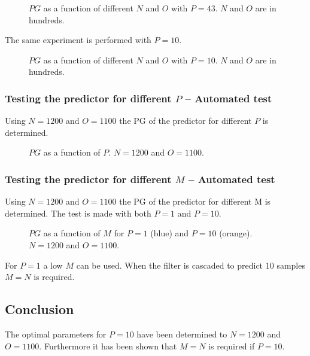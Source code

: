 \begin{figure}[H]
	\centering
	
	\caption{$PG$ as a function of different $N$ and $O$ with $P=43$. $N$ and $O$ are in hundreds.}
	\label{fig:Predict43App}
\end{figure}

The same experiment is performed with $P=10$.
\begin{figure}[H]
	\centering
	
	\caption{$PG$ as a function of different $N$ and $O$ with $P=10$. $N$ and $O$ are in hundreds.}
	\label{fig:Predict10App}
\end{figure}


\subsubsection{Testing the predictor for different $P$ -- Automated test}
Using $N=1200$ and $O=1100$ the PG of the predictor for different $P$ is determined. 
\begin{figure}[H]
	\centering
	
	\caption{$PG$ as a function of $P$. $N=1200$ and $O=1100$.}
	\label{fig:PredictPApp}
\end{figure}

\subsubsection{Testing the predictor for different $M$ -- Automated test}
Using $N=1200$ and $O=1100$ the PG of the predictor for different M is determined. The test is made with both $P=1$ and $P=10$. 
\begin{figure}[H]
	\centering
	
	\caption{$PG$ as a function of $M$ for $P=1$ (blue) and $P=10$ (orange).  $N=1200$ and $O=1100$.}
	\label{fig:PredictMApp}
\end{figure}
For $P=1$ a low $M$ can be used. When the filter is cascaded to predict 10 samples $M=N$ is required. 

\subsection{Conclusion}
The optimal parameters for $P=10$ have been determined to $N=1200$ and $O=1100$. Furthermore it has been shown that $M=N$ is required if $P=10$. 
